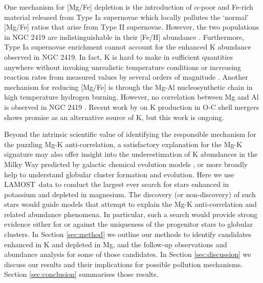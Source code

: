 \documentclass[a4paper,fleqn,usenatbib]{mnras}
\newcommand{\LamostGiants}{454,180}
\newcommand{\project}[1]{#1}
\newcommand{\lamost}{\project{LAMOST}}
\begin{document}
One  mechanism for [Mg/Fe] depletion is the introduction of $\alpha$-poor and Fe-rich material released from Type Ia supernovae \citep{tsujimoto2012first} which locally pollutes the `normal' [Mg/Fe] ratios that arise from Type II supernovae. However, the two populations in NGC 2419 are indistinguishable in their [Fe/H] abundance \citep{cohenkirby2012}. Furthermore, Type Ia supernovae enrichment cannot account for the enhanced K abundance observed in NGC 2419. In fact, K is hard to make in sufficient quantities anywhere without invoking unrealistic temperature conditions or increasing reaction rates from measured values by several orders of magnitude \citep{ventura2012,iliadis2016}. Another mechanism for reducing [Mg/Fe] is through the Mg-Al nucleosynthetic chain in high temperature hydrogen burning. However, no correlation between Mg and Al is observed in NGC 2419 \citep{cohenkirby2012,mucciarelli2012}. Recent work by \cite{ritter2017} on K production in O-C shell mergers shows promise as an alternative source of K, but this work is ongoing. 

Beyond the intrinsic scientific value of identifying the responsible mechanism for the puzzling Mg-K anti-correlation, a satisfactory explanation for the Mg-K signature may also offer insight into the underestimation of K abundances in the Milky Way predicted by galactic chemical evolution models \citep{kobayashi2011}, or more broadly help to understand globular cluster formation and evolution. Here we use \lamost\ data to conduct the largest ever search for stars enhanced in potassium and depleted in magnesium. The discovery (or non-discovery) of such stars would guide models that attempt to explain the Mg-K anti-correlation and related abundance phenomena. In particular, such a search would provide strong evidence either for or against the uniqueness of the progenitor stars to globular clusters. In Section \ref{sec:method} we outline our methods to identify candidates enhanced in K and depleted in Mg, and the follow-up observations and abundance analysis for some of those candidates. In Section \ref{sec:discussion} we discuss our results and their implications for possible pollution mechanisms. Section \ref{sec:conclusion} summarises those results.


\end{document}
